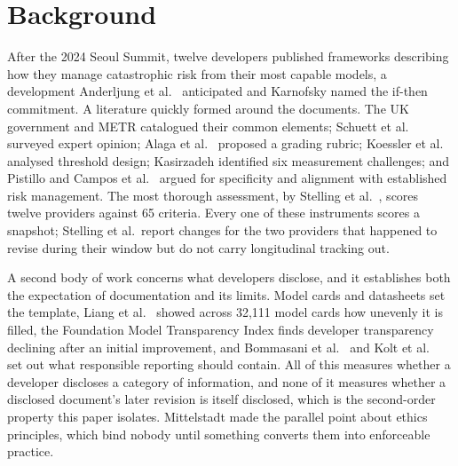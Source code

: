 \documentclass{article}
\begin{document}
\section{Background}
\label{sec:background}

After the 2024 Seoul Summit, twelve developers published frameworks describing how they manage catastrophic risk from their most capable models, a development Anderljung et al.\ \citep{anderljung2023frontier} anticipated and Karnofsky \citep{karnofsky2024ifthen} named the if-then commitment. A literature quickly formed around the documents. The UK government \citep{dsit2023emerging} and METR \citep{metr2024common} catalogued their common elements; Schuett et al.\ \citep{schuett2023towards} surveyed expert opinion; Alaga et al.\ \citep{alaga2024grading} proposed a grading rubric; Koessler et al.\ \citep{koessler2024risk} analysed threshold design; Kasirzadeh \citep{kasirzadeh2024measurement} identified six measurement challenges; and Pistillo \citep{pistillo2025towards} and Campos et al.\ \citep{campos2025frontier} argued for specificity and alignment with established risk management. The most thorough assessment, by Stelling et al.\ \citep{stelling2025evaluating}, scores twelve providers against 65 criteria. Every one of these instruments scores a snapshot; Stelling et al.\ report changes for the two providers that happened to revise during their window but do not carry longitudinal tracking out.

A second body of work concerns what developers disclose, and it establishes both the expectation of documentation and its limits. Model cards \citep{mitchell2019model} and datasheets \citep{gebru2021datasheets} set the template, Liang et al.\ \citep{liang2024systematic} showed across 32,111 model cards how unevenly it is filled, the Foundation Model Transparency Index \citep{bommasani2023fmti,bommasani2024fmti,wan2025fmti} finds developer transparency declining after an initial improvement, and Bommasani et al.\ \citep{bommasani2024reports} and Kolt et al.\ \citep{kolt2024responsible} set out what responsible reporting should contain. All of this measures whether a developer discloses a category of information, and none of it measures whether a disclosed document's later revision is itself disclosed, which is the second-order property this paper isolates. Mittelstadt \citep{mittelstadt2019principles} made the parallel point about ethics principles, which bind nobody until something converts them into enforceable practice.
\end{document}
